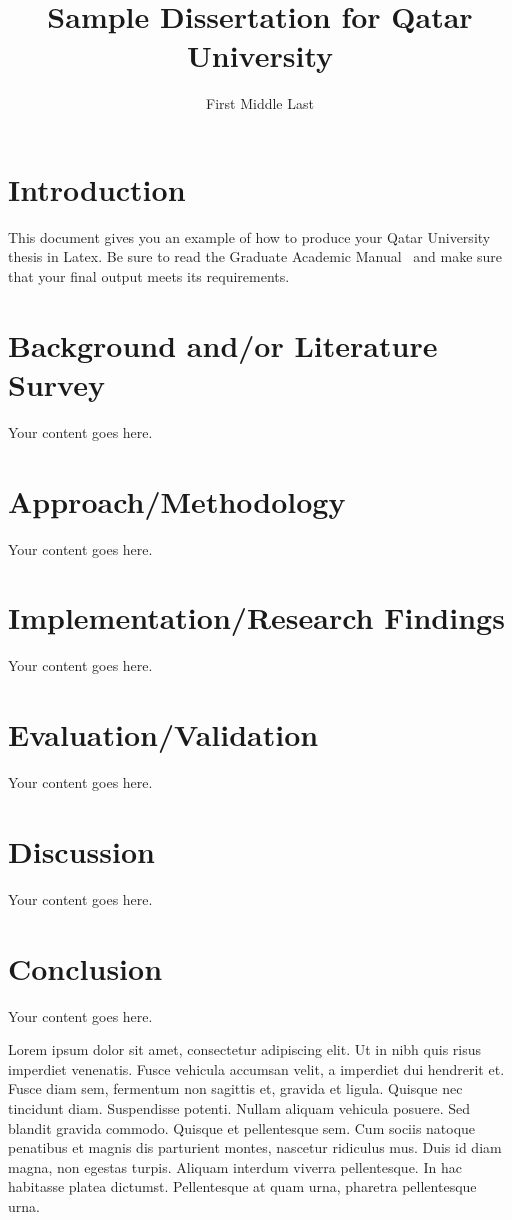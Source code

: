 \documentclass[12pt,lot,lof]{quthesis}
\title{Sample Dissertation for Qatar University}
\author{First Middle Last}
\begin{document}
\makefrontmatter

\chapter{Introduction}
This document gives you an example of how to produce your Qatar 
University thesis in Latex.  Be sure to read the 
Graduate Academic Manual~\cite{qugam} and make sure that your
final output meets its requirements.

\chapter{Background and/or Literature Survey}
Your content goes here.

\chapter{Approach/Methodology}
Your content goes here.

\chapter{Implementation/Research Findings}
Your content goes here.

\chapter{Evaluation/Validation}
Your content goes here.

\chapter{Discussion}
Your content goes here.

\chapter{Conclusion}
Your content goes here.

Lorem ipsum dolor sit amet, consectetur adipiscing elit. Ut in nibh quis risus imperdiet venenatis. Fusce vehicula accumsan velit, a imperdiet dui hendrerit et. Fusce diam sem, fermentum non sagittis et, gravida et ligula. Quisque nec tincidunt diam. Suspendisse potenti. Nullam aliquam vehicula posuere. Sed blandit gravida commodo. Quisque et pellentesque sem. Cum sociis natoque penatibus et magnis dis parturient montes, nascetur ridiculus mus. Duis id diam magna, non egestas turpis. Aliquam interdum viverra pellentesque. In hac habitasse platea dictumst. Pellentesque at quam urna, pharetra pellentesque urna.
\end{document}
